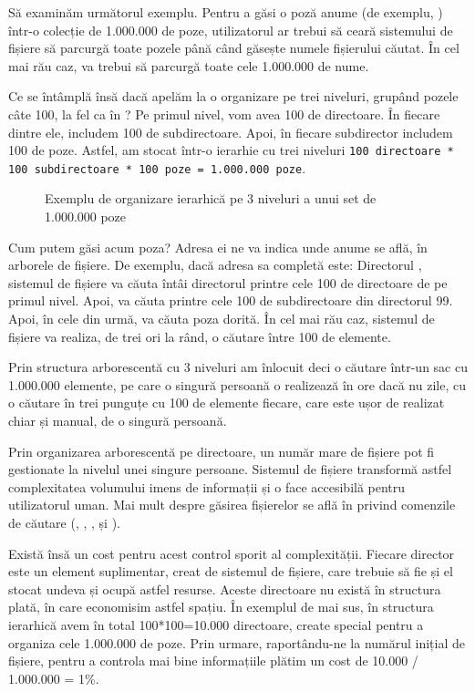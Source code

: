 Să examinăm următorul exemplu. Pentru a găsi o poză anume (de exemplu, ) într-o colecție de 1.000.000 de poze, utilizatorul ar trebui să ceară sistemului de fișiere să parcurgă toate pozele până când găsește numele fișierului căutat. În cel mai rău caz, va trebui să parcurgă toate cele 1.000.000 de nume.

Ce se întâmplă însă dacă apelăm la o organizare pe trei niveluri, grupând pozele câte 100, la fel ca în ? Pe primul nivel, vom avea 100 de directoare. În fiecare dintre ele, includem 100 de subdirectoare. Apoi, în fiecare subdirector includem 100 de poze. Astfel, am stocat într-o ierarhie cu trei niveluri \texttt{100 directoare * 100 subdirectoare * 100 poze = 1.000.000 poze}.

\begin{figure}[htbp]
  \centering
  \def\svgwidth{\columnwidth}
  
  \caption{Exemplu de organizare ierarhică pe 3 niveluri a unui set de 1.000.000 poze}
  \label{fig:fs:ex-3-lvl}
\end{figure}

Cum putem găsi acum poza? Adresa ei ne va indica unde anume se află, în arborele de fișiere. De exemplu, dacă adresa sa completă este: Directorul , sistemul de fișiere va căuta întâi directorul  printre cele 100 de directoare de pe primul nivel. Apoi, va căuta  printre cele 100 de subdirectoare din directorul 99.  Apoi, în cele din urmă, va căuta poza dorită. În cel mai rău caz, sistemul de fișiere va realiza, de trei ori la rând, o căutare între 100 de elemente.

Prin structura arborescentă cu 3 niveluri am înlocuit deci o căutare într-un sac cu 1.000.000 elemente, pe care o singură persoană o realizează în ore dacă nu zile, cu o căutare în trei punguțe cu 100 de elemente fiecare, care este ușor de realizat chiar și manual, de o singură persoană.

Prin organizarea arborescentă pe directoare, un număr mare de fișiere pot fi gestionate la nivelul unei singure persoane. Sistemul de fișiere transformă astfel complexitatea volumului imens de informații și o face accesibilă pentru utilizatorul uman. Mai mult despre găsirea fișierelor se află în  privind comenzile de căutare (, , ,  și ).

Există însă un cost pentru acest control sporit al complexității. Fiecare director este un element suplimentar, creat de sistemul de fișiere, care trebuie să fie și el stocat undeva și ocupă astfel resurse. Aceste directoare nu există în structura plată, în care economisim astfel spațiu. În exemplul de mai sus, în structura ierarhică avem în total 100*100=10.000 directoare, create special pentru a organiza cele 1.000.000 de poze. Prin urmare, raportându-ne la numărul inițial de fișiere, pentru a controla mai bine informațiile plătim un cost de 10.000 / 1.000.000 = 1\%.

